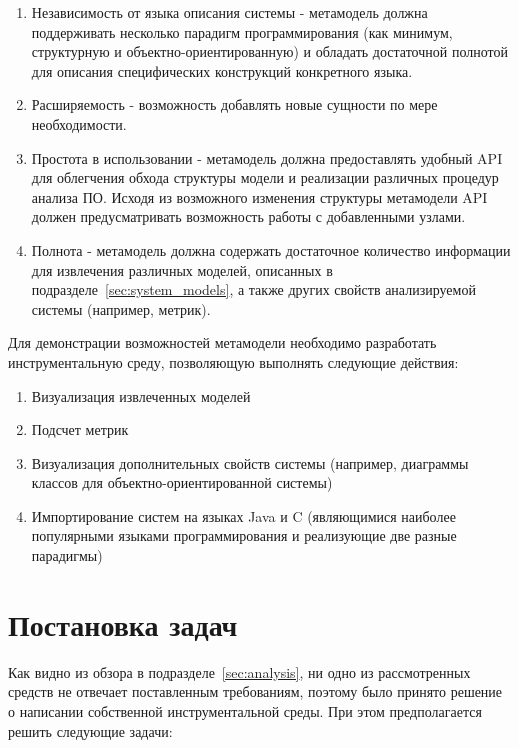 \begin{enumerate}
    \item Независимость от языка описания системы - метамодель должна
    поддерживать несколько парадигм программирования (как минимум, структурную и
    объектно-ориентированную) и обладать достаточной полнотой для
    описания специфических конструкций конкретного языка.
    \item Расширяемость - возможность добавлять новые сущности по мере
    необходимости.
    \item Простота в использовании - метамодель должна предоставлять удобный API
    для облегчения обхода структуры модели и реализации различных процедур
    анализа ПО. Исходя из возможного изменения структуры метамодели API должен
    предусматривать возможность работы с добавленными узлами.
    \item Полнота - метамодель должна содержать достаточное количество
    информации для извлечения различных моделей, описанных в
    подразделе~\ref{sec:system_models}, а также других свойств анализируемой
    системы (например, метрик).
\end{enumerate}

Для демонстрации возможностей метамодели необходимо разработать инструментальную
среду, позволяющую выполнять следующие действия:

\begin{enumerate}
    \item Визуализация извлеченных моделей
    \item Подсчет метрик
    \item Визуализация дополнительных свойств системы (например, диаграммы
    классов для объектно-ориентированной системы)
    \item Импортирование систем на языках Java и C (являющимися наиболее
    популярными языками программирования и реализующие две разные парадигмы)
\end{enumerate}

\section{Постановка задач}
\label{sec:tasks}

Как видно из обзора в подразделе~\ref{sec:analysis}, ни одно из рассмотренных
средств не отвечает поставленным требованиям, поэтому было принято решение о
написании собственной инструментальной среды. При этом предполагается решить
следующие задачи:

